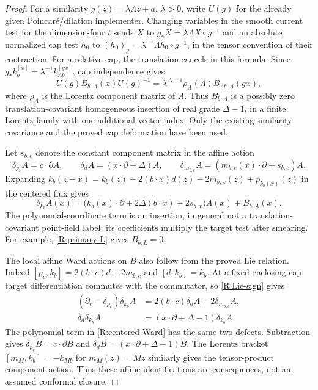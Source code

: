\begin{proof}

For a similarity $g(z)=\lambda\Lambda z+a$, $\lambda>0$, write $U(g)$
for the already given Poincar\'e/dilation implementer.  Changing variables
in the smooth current test for the dimension-four $t$ sends
$X$ to $g_*X=\lambda\Lambda X\circ g^{-1}$ and an absolute normalized
cap test $h_0$ to $(h_0)_g=\lambda^{-1}\Lambda h_0\circ g^{-1}$,
in the tensor convention of their contraction.  For a relative cap,
the translation cancels in this formula.  Since
$g_*k_b^{[x]}=\lambda^{-1}k_{\Lambda b}^{[gx]}$, cap independence gives
\[
 U(g)B_{b,A}(x)U(g)^{-1}
   =\lambda^{\Delta-1}\rho_A(\Lambda)
                       B_{\Lambda b,A}(gx),
\]
where $\rho_A$ is the Lorentz component matrix of $A$.  Thus $B_{b,A}$
is a possibly zero translation-covariant homogeneous insertion of real
grade $\Delta-1$, in a finite Lorentz family with one additional vector index.
Only the existing similarity covariance and the proved cap deformation
have been used.

Let $s_{b,c}$ denote the constant component matrix in the affine action
\[
 \delta_{p_c}A=c\cdot\partial A,\qquad
 \delta_dA=(x\cdot\partial+\Delta)A,\qquad
 \delta_{m_{b,c}}A=(m_{b,c}(x)\cdot\partial+s_{b,c})A.
\]
Expanding
$k_b(z-x)=k_b(z)-2(b\cdot x)d(z)-2m_{b,x}(z)+p_{k_b(x)}(z)$
in the centered flux gives
\begin{equation}\label{R:centered-Ward}
 \delta_{k_b}A(x)
 =\bigl(k_b(x)\cdot\partial+2\Delta(b\cdot x)+2s_{b,x}\bigr)A(x)
       +B_{b,A}(x).
\end{equation}
The polynomial-coordinate term is an insertion, in general not a
translation-covariant point-field label; its coefficients multiply
the target test after smearing.  For example,
\eqref{R:primary-L} gives $B_{b,L}=0$.

The local affine Ward actions on $B$ also follow from the proved Lie
relation.  Indeed
$[p_c,k_b]=2(b\cdot c)d+2m_{b,c}$ and $[d,k_b]=k_b$.
At a fixed enclosing cap target differentiation commutes with the
commutator, so \eqref{R:Lie-sign} gives
\[
 \begin{aligned}
 (\partial_c-\delta_{p_c})\delta_{k_b}A
    &=2(b\cdot c)\delta_dA+2\delta_{m_{b,c}}A,\\
 \delta_d\delta_{k_b}A
    &=(x\cdot\partial+\Delta-1)\delta_{k_b}A .
 \end{aligned}
\]
The polynomial term in \eqref{R:centered-Ward} has the same two
defects.  Subtraction gives
$\delta_{p_c}B=c\cdot\partial B$ and
$\delta_dB=(x\cdot\partial+\Delta-1)B$.
The Lorentz bracket $[m_M,k_b]=-k_{Mb}$ for $m_M(z)=Mz$ similarly
gives the tensor-product component action.  Thus these affine
identifications are consequences, not an assumed conformal closure.


\end{proof}
